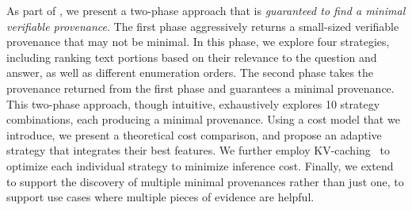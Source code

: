 As part of \sys, 
we present a two-phase approach that is {\em guaranteed to find a minimal verifiable provenance}. 
The first phase aggressively returns a small-sized verifiable provenance 
that may not be minimal.  
In this phase, we explore four strategies, 
including ranking text portions
based on their relevance to the question and answer, 
as well as different enumeration orders. 
The second phase takes the provenance returned from the first phase and  guarantees a minimal provenance. This two-phase approach, though intuitive, exhaustively explores 10 strategy combinations, each producing a minimal provenance. 
Using a cost model that we introduce, 
we present a theoretical cost comparison, and propose an adaptive strategy  
that integrates their best features. 
We further employ KV-caching~\cite{cai2024pyramidkv,liu2024minicache,adnan2024keyformer} to optimize each individual strategy to minimize inference cost. 
Finally, we extend \sys to support the discovery of multiple minimal
provenances rather than just one, to support use cases
where multiple pieces of evidence are helpful. 








